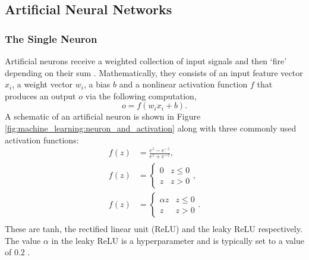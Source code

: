 \subsection{Artificial Neural Networks}

\subsubsection{The Single Neuron}
Artificial neurons receive a weighted collection of input signals and then `fire' depending on their sum \cite{CS231n}. Mathematically, they consists of an input feature vector $x_{i}$, a weight vector $w_{i}$, a bias $b$ and a nonlinear activation function $f$ that produces an output $o$ via the following computation,
\begin{equation}
    o = f(w_{i}x_{i} + b).
\end{equation}
A schematic of an artificial neuron is shown in Figure \ref{fig:machine_learning:neuron_and_activation} along with three commonly used activation functions:
\begin{equation}
    \begin{split}
        f(z) &= \frac{e^{z}-e^{-z}}{e^z+e^{-z}}, \\%
        f(z) &= 
        \begin{cases} 
            0 & z \leq 0\\
            z & z > 0
        \end{cases}, \\%
        f(z) &=  
        \begin{cases} 
            \alpha{z} & z \leq 0\\
            z & z > 0
        \end{cases}. \\%
    \end{split}
\end{equation}
These are tanh, the rectified linear unit (ReLU) and the leaky ReLU respectively. 
The value $\alpha$ in the leaky ReLU is a hyperparameter and is typically set to a value of $0.2$ \cite{CS231n}.
